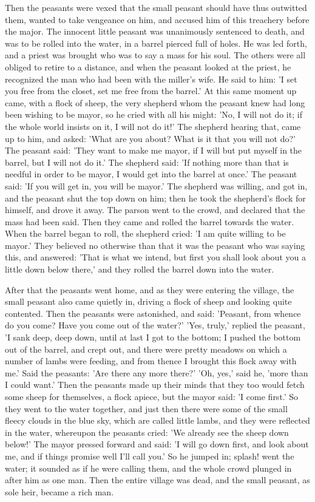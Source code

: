 \documentclass[12pt]{book}
\begin{document}
Then the peasants were vexed that the small peasant should have thus
outwitted them, wanted to take vengeance on him, and accused him of
this treachery before the major. The innocent little peasant was
unanimously sentenced to death, and was to be rolled into the water,
in a barrel pierced full of holes. He was led forth, and a priest was
brought who was to say a mass for his soul. The others were all
obliged to retire to a distance, and when the peasant looked at the
priest, he recognized the man who had been with the miller's wife. He
said to him: 'I set you free from the closet, set me free from the
barrel.' At this same moment up came, with a flock of sheep, the very
shepherd whom the peasant knew had long been wishing to be mayor, so
he cried with all his might: 'No, I will not do it; if the whole world
insists on it, I will not do it!' The shepherd hearing that, came up
to him, and asked: 'What are you about? What is it that you will not
do?' The peasant said: 'They want to make me mayor, if I will but put
myself in the barrel, but I will not do it.' The shepherd said: 'If
nothing more than that is needful in order to be mayor, I would get
into the barrel at once.' The peasant said: 'If you will get in, you
will be mayor.' The shepherd was willing, and got in, and the peasant
shut the top down on him; then he took the shepherd's flock for
himself, and drove it away. The parson went to the crowd, and declared
that the mass had been said. Then they came and rolled the barrel
towards the water. When the barrel began to roll, the shepherd cried:
'I am quite willing to be mayor.' They believed no otherwise than that
it was the peasant who was saying this, and answered: 'That is what we
intend, but first you shall look about you a little down below there,'
and they rolled the barrel down into the water.

After that the peasants went home, and as they were entering the
village, the small peasant also came quietly in, driving a flock of
sheep and looking quite contented. Then the peasants were astonished,
and said: 'Peasant, from whence do you come? Have you come out of the
water?' 'Yes, truly,' replied the peasant, 'I sank deep, deep down,
until at last I got to the bottom; I pushed the bottom out of the
barrel, and crept out, and there were pretty meadows on which a number
of lambs were feeding, and from thence I brought this flock away with
me.' Said the peasants: 'Are there any more there?' 'Oh, yes,' said
he, 'more than I could want.' Then the peasants made up their minds
that they too would fetch some sheep for themselves, a flock apiece,
but the mayor said: 'I come first.' So they went to the water
together, and just then there were some of the small fleecy clouds in
the blue sky, which are called little lambs, and they were reflected
in the water, whereupon the peasants cried: 'We already see the sheep
down below!' The mayor pressed forward and said: 'I will go down
first, and look about me, and if things promise well I'll call you.'
So he jumped in; splash! went the water; it sounded as if he were
calling them, and the whole crowd plunged in after him as one man.
Then the entire village was dead, and the small peasant, as sole heir,
became a rich man.
\end{document}
